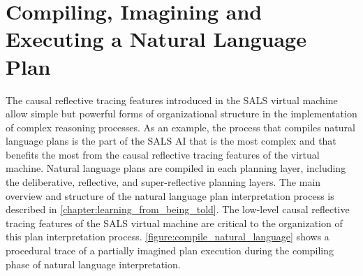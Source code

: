 \section{Compiling, Imagining and Executing a Natural Language Plan}

The causal reflective tracing features introduced in the SALS virtual
machine allow simple but powerful forms of organizational structure in
the implementation of complex reasoning processes.  As an example, the
process that compiles natural language plans is the part of the SALS
AI that is the most complex and that benefits the most from the causal
reflective tracing features of the virtual machine.  Natural language
plans are compiled in each planning layer, including the deliberative,
reflective, and super-reflective planning layers.  The main overview
and structure of the natural language plan interpretation process is
described in {\mbox{\autoref{chapter:learning_from_being_told}}}.  The
low-level causal reflective tracing features of the SALS virtual
machine are critical to the organization of this plan interpretation
process.  {\mbox{\autoref{figure:compile_natural_language}}} shows a
procedural trace of a partially imagined plan execution during the
compiling phase of natural language interpretation.
